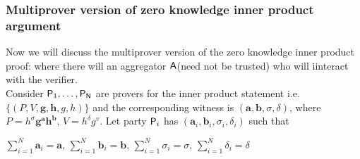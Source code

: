 \subsubsection{Multiprover version of zero knowledge inner product argument}
Now we will discuss the multiprover version of the zero knowledge inner product proof: where there will an aggregator $\mathsf{A}$(need not be trusted) who will iinteract with the verifier.\\
Consider $\mathsf{P}_1,\ldots, \mathsf{P}_{\mathsf{N}}$ are provers for the inner product statement i.e. $\{(P,V,\bm{g},\bm{h},g,h)\}$ and the corresponding witness is $(\bm{a},\bm{b}, \sigma, \delta)$, where $P= h^{\sigma} \bm{g}^{\bm{a}} \bm{h}^{\bm{b}}$, $V=h^{\delta}g^{v}$. Let party $\mathsf{P}_i$ has $(\bm{a}_i,\bm{b}_i,\sigma_i,\delta_i)$ such that
\begin{center}
	$\sum\limits_{i=1}^{N}\bm{a}_i=\bm{a}$,\text{ }
	$\sum\limits_{i=1}^{N}\bm{b}_i=\bm{b}$,\text{ }
	$\sum\limits_{i=1}^{N}\sigma_i=\sigma$,\text{ }
	$\sum\limits_{i=1}^{N}\delta_i=\delta$ \text{ }
\end{center}

